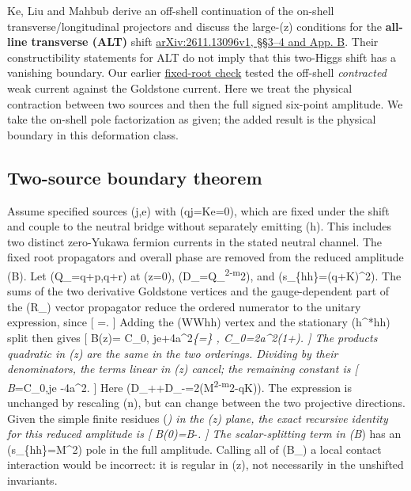 \documentclass[
  11pt,
]{article}
\begin{document}
Ke, Liu and Mahbub derive an off-shell continuation of the on-shell
transverse/longitudinal projectors and discuss the large-(z) conditions
for the \textbf{all-line transverse (ALT)} shift
\href{https://arxiv.org/html/2611.13096v1\#S3}{arXiv:2611.13096v1,
§§3--4 and App. B}. Their constructibility statements for ALT do not
imply that this two-Higgs shift has a vanishing boundary. Our earlier
\href{https://github.com/lm846802297-bit/off-shell-vector-polarization/tree/6d92e34be9694920dc0c64fd0a1d18747ccb6622/research-baselines/su2-fivepoint-fixedq-boundary}{fixed-root
check} tested the off-shell \emph{contracted} weak current against the
Goldstone current. Here we treat the physical contraction between two
sources and then the full signed six-point amplitude. We take the
on-shell pole factorization as given; the added result is the physical
boundary in this deformation class.

\subsection{Two-source boundary
theorem}\label{two-source-boundary-theorem}

Assume specified sources (j,e) with (q\cdot j=K\cdot e=0), which are
fixed under the shift and couple to the neutral bridge without
separately emitting (h). This includes two distinct zero-Yukawa fermion
currents in the stated neutral channel. The fixed root propagators and
overall phase are removed from the reduced amplitude (\mathcal B). Let
(Q\_\pm=q+p,q+r) at (z=0), (D\_\pm=Q\_\pm\textsuperscript{2-m}2), and
(s\_\{hh\}=(q+K)\^{}2). The sums of the two derivative Goldstone
vertices and the gauge-dependent part of the (R\_\xi) vector propagator
reduce the ordered numerator to the unitary expression, since {[}
 =. {]}
Adding the (WWhh) vertex and the stationary (h\^{}*\to hh) split then
gives {[} \mathcal B(z)= C\_0, j\cdot e+4a\^{}2\sum\emph{\{\sigma=\}
,
\quad C\_0=2a\^{}2\left(1+\right). {]} The
products quadratic in (z) are the same in the two orderings. Dividing by
their denominators, the terms linear in (z) cancel; the remaining
constant is {[} B}\infty=C\_0,j\cdot e -4a\^{}2. {]} Here (D\_++D\_-=2(M\textsuperscript{2-m}2-q\cdot K)). The
expression is unchanged by rescaling (n), but can change between the two
projective directions. Given the simple finite residues
(\rho\emph{\sigma) in the (z) plane, the exact recursive identity for
this reduced amplitude is {[}
\mathcal B(0)=B}\infty-\sum\emph{\sigma{}. {]}
The scalar-splitting term in (B}\infty) has an (s\_\{hh\}=M\^{}2) pole
in the full amplitude. Calling all of (B\_\infty) a local contact
interaction would be incorrect: it is regular in (z), not necessarily in
the unshifted invariants.
\end{document}
